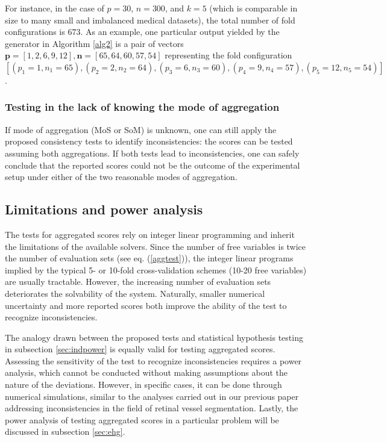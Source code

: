 \documentclass[3p, times]{elsarticle}
\begin{document}
For instance, in the case of $p=30$, $n=300$, and $k=5$ (which is comparable in size to many small and imbalanced medical datasets), the total number of fold configurations is $673$. As an example, one particular output yielded by the generator in Algorithm \ref{alg2} is a pair of vectors $\mathbf{p}=[1, 2, 6, 9, 12], \mathbf{n} = [65, 64, 60, 57, 54]$ representing the fold configuration $[(p_1=1, n_1=65), (p_2=2, n_2=64), (p_3=6, n_3=60), (p_4=9, n_4=57), (p_5=12, n_5=54)]$.

\subsubsection{Testing in the lack of knowing the mode of aggregation}
\label{sec:lackagg}

If mode of aggregation (MoS or SoM) is unknown, one can still apply the proposed consistency tests to identify inconsistencies: the scores can be tested assuming both aggregations. If both tests lead to inconsistencies, one can safely conclude that the reported scores could not be the outcome of the experimental setup under either of the two reasonable modes of aggregation.

{\color{blue} 

\subsection{Limitations and power analysis}
\label{sec:aggpower}

The tests for aggregated scores rely on integer linear programming and inherit the limitations of the available solvers. Since the number of free variables is twice the number of evaluation sets (see eq. (\ref{aggtest})), the integer linear programs implied by the typical 5- or 10-fold cross-validation schemes (10-20 free variables) are usually tractable. However, the increasing number of evaluation sets deteriorates the solvability of the system. Naturally, smaller numerical uncertainty and more reported scores both improve the ability of the test to recognize inconsistencies.

The analogy drawn between the proposed tests and statistical hypothesis testing in subsection \ref{sec:indpower} is equally valid for testing aggregated scores. Assessing the sensitivity of the test to recognize inconsistencies requires a power analysis, which cannot be conducted without making assumptions about the nature of the deviations. However, in specific cases, it can be done through numerical simulations, similar to the analyses carried out in our previous paper \cite{vessel} addressing inconsistencies in the field of retinal vessel segmentation. Lastly, the power analysis of testing aggregated scores in a particular problem will be discussed in subsection \ref{sec:ehg}.
}
\end{document}
